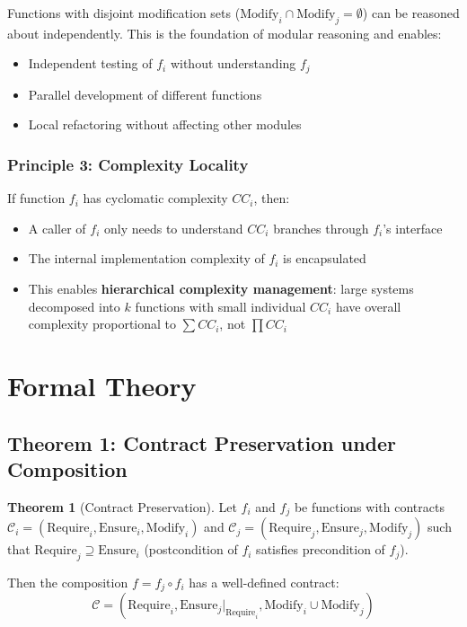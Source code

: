 \documentclass[a4paper,12pt]{article}
\theoremstyle{definition}
\newtheorem{theorem}{Theorem}
\begin{document}
Functions with disjoint modification sets ($\mathrm{Modify}_i \cap \mathrm{Modify}_j = \emptyset$) can be reasoned about independently. This is the foundation of modular reasoning and enables:

\begin{itemize}
	\item Independent testing of $f_i$ without understanding $f_j$
	\item Parallel development of different functions
	\item Local refactoring without affecting other modules
\end{itemize}

\subsubsection{Principle 3: Complexity Locality}

If function $f_i$ has cyclomatic complexity $CC_i$, then:

\begin{itemize}
	\item A caller of $f_i$ only needs to understand $CC_i$ branches through $f_i$'s interface
	\item The internal implementation complexity of $f_i$ is encapsulated
	\item This enables \textbf{hierarchical complexity management}: large systems decomposed into $k$ functions with small individual $CC_i$ have overall complexity proportional to $\sum CC_i$, not $\prod CC_i$
\end{itemize}

\section{Formal Theory}

\subsection{Theorem 1: Contract Preservation under Composition}

\begin{theorem}[Contract Preservation]
\label{thm:contract_preservation}
Let $f_i$ and $f_j$ be functions with contracts $\mathcal{C}_i = (\mathrm{Require}_i, \mathrm{Ensure}_i, \mathrm{Modify}_i)$ and $\mathcal{C}_j = (\mathrm{Require}_j, \mathrm{Ensure}_j, \mathrm{Modify}_j)$ such that $\mathrm{Require}_j \supseteq \mathrm{Ensure}_i$ (postcondition of $f_i$ satisfies precondition of $f_j$).

Then the composition $f = f_j \circ f_i$ has a well-defined contract:
\[
\mathcal{C} = (\mathrm{Require}_i, \mathrm{Ensure}_j|_{\mathrm{Require}_i}, \mathrm{Modify}_i \cup \mathrm{Modify}_j)
\]
\end{theorem}
\end{document}
